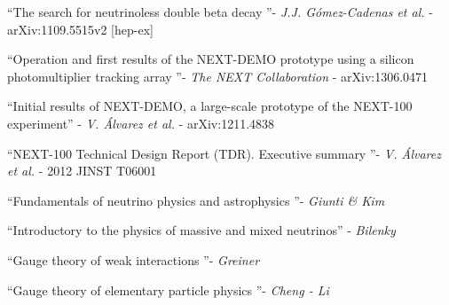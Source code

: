 \documentclass[a4paper,12pt]{article}
\newcommand{\bbcn}[0]{$\beta\beta0\nu$ }
\begin{document}


\begin{thebibliography}{12}
``The search for neutrinoless double beta decay ''- \textit{J.J. Gómez-Cadenas et al.} - arXiv:1109.5515v2 [hep-ex]

``Operation and first results of the NEXT-DEMO prototype using a silicon photomultiplier tracking array ''- \textit{The NEXT Collaboration} - arXiv:1306.0471

\bibitem{}
``Initial results of NEXT-DEMO, a large-scale prototype of the NEXT-100 experiment'' - \textit{V. Álvarez et al.} - arXiv:1211.4838

``NEXT-100 Technical Design Report (TDR). Executive summary ''- \textit{V. Álvarez et al.} - 2012 JINST  T06001


``Fundamentals of neutrino physics and astrophysics ''- \textit{Giunti \& Kim}

``Introductory to the physics of massive and mixed neutrinos''  - \textit{Bilenky}

``Gauge theory of weak interactions ''- \textit{Greiner}

``Gauge theory of elementary particle physics ''- \textit{Cheng - Li}
\end{thebibliography}

\end{document}
